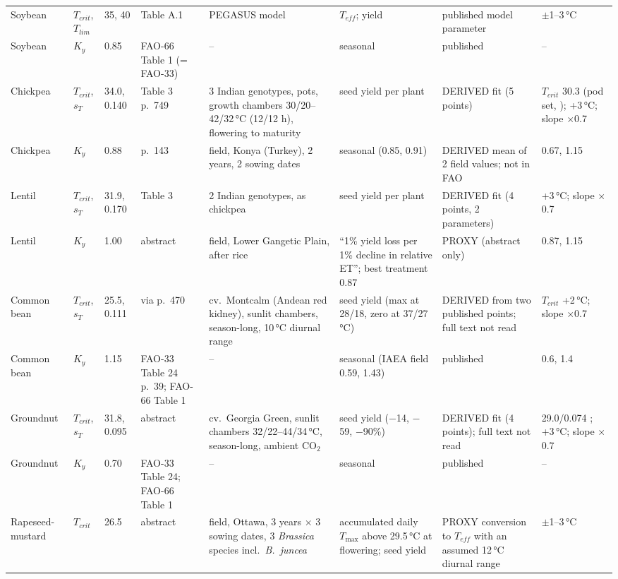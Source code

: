 {\begin{longtable}{L{0.091}L{0.098}L{0.098}L{0.171}L{0.183}L{0.140}L{0.122}L{0.098}}
Soybean & $T_{crit}$, $T_{lim}$ & 35, 40 & \citet{deryng2014} Table A.1 & PEGASUS model & $T_{eff}$; yield & published model parameter & $\pm$1--3\,\si{\celsius} \\
Soybean & $K_y$ & 0.85 & FAO-66 Table 1 (= FAO-33) & -- & seasonal & published & -- \\
Chickpea & $T_{crit}$, $s_T$ & 34.0, 0.140 & \citet{bhandari2020} Table 3 p.~749 & 3 Indian genotypes, pots, growth chambers 30/20--42/32\,\si{\celsius} (12/12 h), flowering to maturity & seed yield per plant & DERIVED fit (5 points) & $T_{crit}$ 30.3 (pod set, \citealp{devasirvatham2013}); +3\,\si{\celsius}; slope $\times$0.7 \\
Chickpea & $K_y$ & 0.88 & \citet{tari2022} p.~143 & field, Konya (Turkey), 2 years, 2 sowing dates & seasonal (0.85, 0.91) & DERIVED mean of 2 field values; not in FAO & 0.67, 1.15 \\
Lentil & $T_{crit}$, $s_T$ & 31.9, 0.170 & \citet{bhandari2020} Table 3 & 2 Indian genotypes, as chickpea & seed yield per plant & DERIVED fit (4 points, 2 parameters) & +3\,\si{\celsius}; slope $\times$0.7 \\
Lentil & $K_y$ & 1.00 & \citet{nandi2021} abstract & field, Lower Gangetic Plain, after rice & ``1\% yield loss per 1\% decline in relative ET''; best treatment 0.87 & PROXY (abstract only) & 0.87, 1.15 \\
Common bean & $T_{crit}$, $s_T$ & 25.5, 0.111 & \citet{prasad2002bean} via \citet{boote2005} p.~470 & cv.\ Montcalm (Andean red kidney), sunlit chambers, season-long, 10\,\si{\celsius} diurnal range & seed yield (max at 28/18, zero at 37/27\,\si{\celsius}) & DERIVED from two published points; full text not read & $T_{crit}$ +2\,\si{\celsius}; slope $\times$0.7 \\
Common bean & $K_y$ & 1.15 & FAO-33 Table 24 p.~39; FAO-66 Table 1 & -- & seasonal (IAEA field 0.59, 1.43) & published & 0.6, 1.4 \\
Groundnut & $T_{crit}$, $s_T$ & 31.8, 0.095 & \citet{prasad2003peanut} abstract & cv.\ Georgia Green, sunlit chambers 32/22--44/34\,\si{\celsius}, season-long, ambient CO$_2$ & seed yield ($-$14, $-$59, $-$90\%) & DERIVED fit (4 points); full text not read & 29.0/0.074 \citep{boote2005}; +3\,\si{\celsius}; slope $\times$0.7 \\
Groundnut & $K_y$ & 0.70 & FAO-33 Table 24; FAO-66 Table 1 & -- & seasonal & published & -- \\
Rapeseed-mustard & $T_{crit}$ & 26.5 & \citet{morrison2002} abstract & field, Ottawa, 3 years $\times$ 3 sowing dates, 3 \emph{Brassica} species incl.\ \emph{B.~juncea} & accumulated daily $T_{\max}$ above 29.5\,\si{\celsius} at flowering; seed yield & PROXY conversion to $T_{eff}$ with an assumed 12\,\si{\celsius} diurnal range & $\pm$1--3\,\si{\celsius} \\

\end{longtable}}
